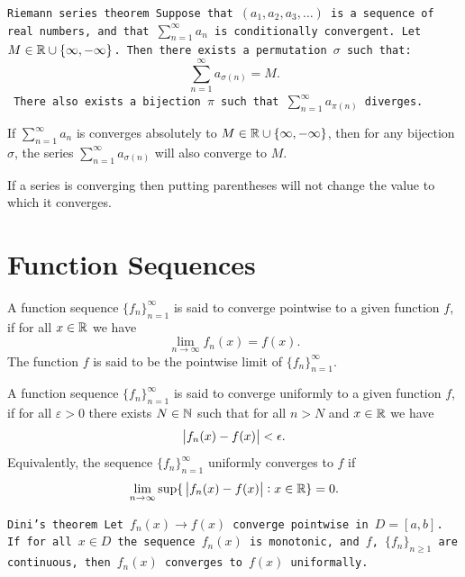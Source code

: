 \documentclass[11pt,a4paper]{article}
\begin{document}
  \begin{theorem}\tt{Riemann series theorem}
    Suppose that $(a_{1}, a_{2}, a_{3}, \ldots)$ is a sequence of real numbers, 
    and that $\sum_{n=1}^{\infty} a_n$ is conditionally convergent. 
    Let $M \in \mathbb{R} \cup \{\infty,-\infty\}$.
    Then there exists a permutation $\sigma$ such that:
    \[
      \sum_{n=1}^{\infty} a_{\sigma(n)} = M.
    \] 
    There also exists a bijection $\pi$ such that
    $\sum_{n=1}^{\infty} a_{\pi(n)}$ diverges.
  \end{theorem}
  \begin{remark}
    If $\sum_{n=1}^{\infty} a_n$ is converges absolutely to 
    $M \in \mathbb{R} \cup \{\infty, -\infty\}$,
    then for any bijection $\sigma$, the series
    $\sum_{n=1}^{\infty} a_{\sigma(n)}$ will also converge to $M$.
  \end{remark}
  \begin{remark}
    If a series is converging then putting parentheses will not change the
    value to which it converges.
  \end{remark}

  \newpage
  
  \section{Function Sequences}
  \begin{definition}
    A function sequence $\{f_n\}_{n=1}^{\infty}$ is said to converge
    pointwise to a given function $f$, if for all $x \in \mathbb{R}$ we have
    \[
      \lim _{n \to \infty } f_{n}(x) = f(x).
    \]
    The function $f$ is said to be the pointwise limit of
    $\{f_n\}_{n=1}^{\infty}$.
  \end{definition}

  \begin{definition}
    A function sequence $\{f_n\}_{n=1}^{\infty}$ is said to converge
    uniformly to a given function $f$, if for all $\varepsilon > 0$ there
    exists $N \in \mathbb{N}$ such that for all $n > N$ and $x \in \mathbb{R}$ we have
    \[
      \left\lvert f_{n}(x) - f(x)\right\rvert < \epsilon.
    \]
    Equivalently, the sequence $\{f_n\}_{n=1}^{\infty}$ uniformly converges
    to $f$ if
    \[
      \lim_{n \to \infty }
      \sup\{\,\left\lvert f_{n}(x) - f(x)\right\rvert:x\in \mathbb{R}\} = 0.
    \]
  \end{definition}

  \begin{theorem}\tt{Dini's theorem}
    Let $f_n(x)\to f(x)$ converge pointwise in $D = [a,b]$.
    If for all $x \in D$ the sequence $f_n(x)$ is monotonic,
    and $f$, $\{f_n\}_{n \geq 1}$ are continuous,
    then $f_n(x)$ converges to $f(x)$ uniformally.
  \end{theorem}
\end{document}
